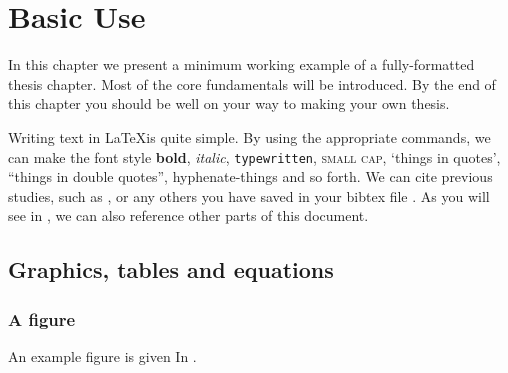 \chapter{Basic Use}
\label{chap:basicUse}

\begin{chapabstract}
In this chapter we present a minimum working example of a fully-formatted thesis chapter. Most of the core fundamentals will be introduced. By the end of this chapter you should be well on your way to making your own thesis.
\end{chapabstract}

Writing text in \LaTeX is quite simple. By using the appropriate commands, we can make the font style \textbf{bold}, \textit{italic}, \texttt{typewritten}, \textsc{small cap}, `things in quotes', ``things in double quotes'', hyphenate-things and so forth. We can cite previous studies, such as \cite{testington2011effects}, or any others you have saved in your bibtex file \citep[\eg][]{neddis2009best, jones1986coping}. As you will see in , we can also reference other parts of this document.


\section{Graphics, tables and equations}
\label{sec:exampleSection} %

\subsection{A figure}
An example figure is given In .

